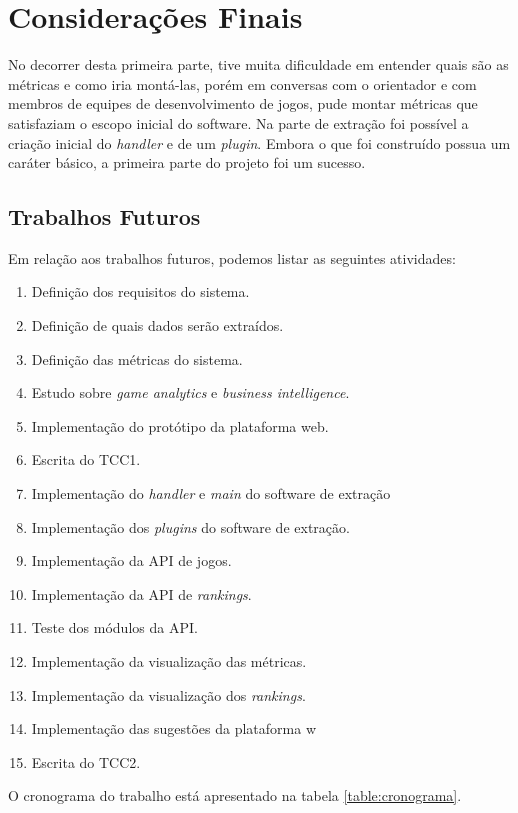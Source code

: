 \chapter[Considerações Finais]{Considerações Finais}
No decorrer desta primeira parte, tive muita dificuldade em entender quais são as métricas e como iria montá-las, porém em conversas com o orientador e com membros de equipes de desenvolvimento de jogos, pude montar métricas que satisfaziam o escopo inicial do software. Na parte de extração foi possível a criação inicial do \textit{handler} e de um \textit{plugin}. Embora o que foi construído possua um caráter básico, a primeira parte do projeto foi um sucesso.
\section{Trabalhos Futuros}
Em relação aos trabalhos futuros, podemos listar as seguintes atividades:
\begin{enumerate}
	\item \label{t1} Definição dos requisitos do sistema.
	\item \label{t2} Definição de quais dados serão extraídos.
	\item \label{t3} Definição das métricas do sistema.
	\item \label{t4} Estudo sobre \textit{game analytics} e \textit{business intelligence}.
	\item \label{t5} Implementação do protótipo da plataforma web.
	\item \label{t6} Escrita do TCC1.
	\item \label{t7} Implementação do \textit{handler} e \textit{main} do software de extração
	\item \label{t8} Implementação dos \textit{plugins} do software de extração.
	\item \label{t9} Implementação da API de jogos.
	\item \label{t10} Implementação da API de \textit{rankings}.
	\item \label{t11} Teste dos módulos da API.
	\item \label{t12} Implementação da  visualização das métricas.
	\item \label{t13} Implementação da visualização dos \textit{rankings}.
	\item \label{t14} Implementação das sugestões da plataforma w
	\item \label{t15} Escrita do TCC2.
\end{enumerate}
O cronograma do trabalho está apresentado na tabela \ref{table:cronograma}.
